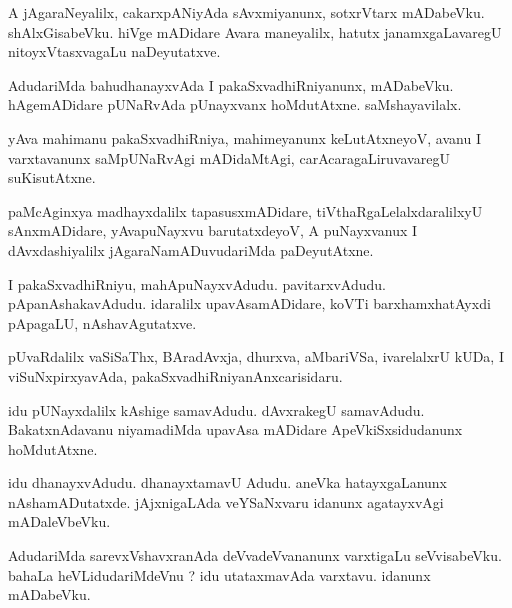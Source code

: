 \documentclass{article}
\begin{document}
\begin{mn}%
A jAgaraNeyalilx, cakarxpANiyAda sAvxmiyanunx, sotxrVtarx mADabeVku. shAlxGisabeVku. hiVge mADidare 
Avara maneyalilx, hatutx janamxgaLavaregU nitoyxVtasxvagaLu naDeyutatxve.
\end{mn}

\begin{mn}%
AdudariMda bahudhanayxvAda I pakaSxvadhiRniyanunx, mADabeVku. hAgemADidare pUNaRvAda pUnayxvanx 
hoMdutAtxne. saMshayavilalx.
\end{mn}

\begin{mn}%
yAva mahimanu pakaSxvadhiRniya, mahimeyanunx keLutAtxneyoV, avanu I varxtavanunx saMpUNaRvAgi 
mADidaMtAgi, carAcaragaLiruvavaregU suKisutAtxne.
\end{mn}

\begin{mn}%
paMcAginxya madhayxdalilx tapasusxmADidare, tiVthaRgaLelalxdaralilxyU sAnxmADidare, yAvapuNayxvu 
barutatxdeyoV, A puNayxvanux I dAvxdashiyalilx jAgaraNamADuvudariMda paDeyutAtxne.
\end{mn}

\begin{mn}%
I pakaSxvadhiRniyu, mahApuNayxvAdudu. pavitarxvAdudu. pApanAshakavAdudu. idaralilx upavAsamADidare, 
koVTi barxhamxhatAyxdi pApagaLU, nAshavAgutatxve.
\end{mn}

\begin{mn}%
pUvaRdalilx vaSiSaThx, BAradAvxja, dhurxva, aMbariVSa, ivarelalxrU kUDa, I viSuNxpirxyavAda, 
pakaSxvadhiRniyanAnxcarisidaru.
\end{mn}

\begin{mn}%
idu pUNayxdalilx kAshige samavAdudu. dAvxrakegU samavAdudu. BakatxnAdavanu niyamadiMda upavAsa 
mADidare ApeVkiSxsidudanunx hoMdutAtxne.
\end{mn}

\begin{mn}%
idu dhanayxvAdudu. dhanayxtamavU Adudu. aneVka hatayxgaLanunx nAshamADutatxde. jAjxnigaLAda 
veYSaNxvaru idanunx agatayxvAgi mADaleVbeVku.
\end{mn}

\begin{mn}%
AdudariMda sarevxVshavxranAda deVvadeVvananunx varxtigaLu seVvisabeVku. bahaLa heVLidudariMdeVnu ? 
idu utataxmavAda varxtavu. idanunx mADabeVku.
\end{mn}
\end{document}
